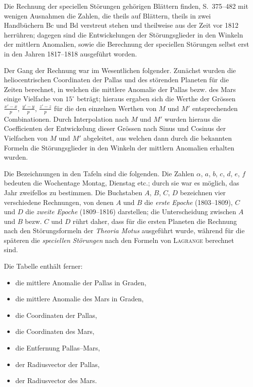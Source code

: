 \documentclass[10pt,a4paper]{article}
\begin{document}
Die Rechnung der speciellen St\"orungen geh\"origen Bl\"attern finden, S.~375--482 mit wenigen Ausnahmen die Zahlen, die theils auf Bl\"attern, theils in zwei Handb\"uchern Bc und Bd verstreut stehen und theilweise aus der Zeit vor 1812 herr\"uhren; dagegen sind die Entwickelungen der St\"orungsglieder in den Winkeln der mittlern Anomalien, sowie die Berechnung der speciellen St\"orungen selbst erst in den Jahren 1817--1818 ausgef\"uhrt worden.

Der Gang der Rechnung war im Wesentlichen folgender. Zun\"achst wurden die heliocentrischen Coordinaten der Pallas und des st\"orenden Planeten f\"ur die Zeiten berechnet, in welchen die mittlere Anomalie der Pallas bezw. des Mars einige Vielfache von $15^\circ$ betr\"agt; hieraus ergaben sich die Werthe der Gr\"ossen $\frac{x'-x}{p}$, $\frac{y'-y}{p}$, $\frac{z'-z}{p}$ f\"ur die den einzelnen Werthen von $M$ und $M'$ entsprechenden Combinationen. Durch Interpolation nach $M$ und $M'$ wurden hieraus die Coefficienten der Entwickelung dieser Gr\"ossen nach Sinus und Cosinus der Vielfachen von $M$ und $M'$ abgeleitet, aus welchen dann durch die bekannten Formeln die St\"orungsglieder in den Winkeln der mittlern Anomalien erhalten wurden.

\newpage
Die Bezeichnungen in den Tafeln sind die folgenden. Die Zahlen $\alpha$, $a$, $b$, $c$, $d$, $e$, $f$ bedeuten die Wochentage Montag, Dienstag etc.; durch sie war es m\"oglich, das Jahr zweifellos zu bestimmen. Die Buchstaben $A$, $B$, $C$, $D$ bezeichnen vier verschiedene Rechnungen, von denen $A$ und $B$ die \textit{erste Epoche} (1803--1809), $C$ und $D$ die \textit{zweite Epoche} (1809--1816) darstellen; die Unterscheidung zwischen $A$ und $B$ bezw. $C$ und $D$ r\"uhrt daher, dass f\"ur die ersten Planeten die Rechnung nach den St\"orungsformeln der \textit{Theoria Motus} ausgef\"uhrt wurde, w\"ahrend f\"ur die sp\"ateren die \textit{speciellen St\"orungen} nach den Formeln von\textsc{ Lagrange} berechnet sind.

Die Tabelle enth\"alt ferner:
\begin{itemize}[leftmargin=2em]
\item[$T$] die mittlere Anomalie der Pallas in Graden,
\item[$M$] die mittlere Anomalie des Mars in Graden,
\item[$x$, $y$, $z$] die Coordinaten der Pallas,
\item[$x'$, $y'$, $z'$] die Coordinaten des Mars,
\item[$p$] die Entfernung Pallas--Mars,
\item[$r$] der Radiusvector der Pallas,
\item[$r'$] der Radiusvector des Mars.
\end{itemize}
\end{document}
